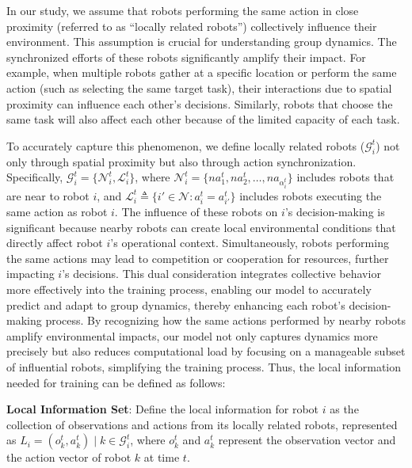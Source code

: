 \documentclass[lettersize,journal]{IEEEtran}
\begin{document}
In our study, we assume that robots performing the same action in close proximity (referred to as “locally related robots”) collectively influence their environment. This assumption is crucial for understanding group dynamics. The synchronized efforts of these robots significantly amplify their impact. For example, when multiple robots gather at a specific location or perform the same action (such as selecting the same target task), their interactions due to spatial proximity can influence each other's decisions. Similarly, robots that choose the same task will also affect each other because of the limited capacity of each task.

To accurately capture this phenomenon, we define locally related robots ($\mathcal{G}_{i}^t$) not only through spatial proximity but also through action synchronization. Specifically, $\mathcal{G}_{i}^t=\{{\mathcal{N}}_{i}^t,{\mathcal{L}}_{i}^t\}$, where $\mathcal{N}_{i}^t=\{n a_{1}^t,n a_{2}^t,\ldots,n a_{\alpha_{i}^t}\}$ includes robots that are near to robot $i$, and $\mathcal{L}_{i}^t \triangleq \{i' \in \mathcal{N} : a_{i}^t = a_{i'}^t\}$ includes robots executing the same action as robot $i$. The influence of these robots on $i$'s decision-making is significant because nearby robots can create local environmental conditions that directly affect robot $i$'s operational context. Simultaneously, robots performing the same actions may lead to competition or cooperation for resources, further impacting $i$'s decisions. This dual consideration integrates collective behavior more effectively into the training process, enabling our model to accurately predict and adapt to group dynamics, thereby enhancing each robot's decision-making process. By recognizing how the same actions performed by nearby robots amplify environmental impacts, our model not only captures dynamics more precisely but also reduces computational load by focusing on a manageable subset of influential robots, simplifying the training process. Thus, the local information needed for training can be defined as follows:

\textbf{Local Information Set}: Define the local information for robot $i$ as the collection of observations and actions from its locally related robots, represented as $L_i = {(o_k^t, a_k^t) \mid k \in \mathcal{G}_i^t}$, where $o_k^t$ and $a_k^t$ represent the observation vector and the action vector of robot $k$ at time $t$.
\end{document}
